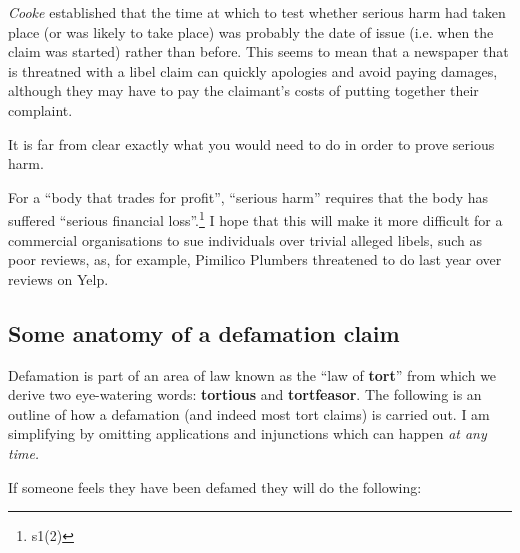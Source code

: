 \documentclass[]{article}
\begin{document}
{\it Cooke} established that the time at which to test whether serious harm had taken place (or was likely to take place) was probably the date of issue (i.e. when the claim was started) rather than before. This seems to mean that a newspaper that is threatned with a libel claim can quickly apologies and avoid paying damages, although they may have to pay the claimant's costs of putting together their complaint.

It is far from clear exactly what you would need to do in order to prove serious harm.

For a ``body that trades for profit'', ``serious harm'' requires that the body has suffered ``serious financial loss''.\footnote{s1(2)} I hope that this will make it more difficult for a commercial organisations to sue individuals over trivial alleged libels, such as poor reviews, as, for example, Pimilico Plumbers threatened to do last year over reviews on Yelp.

\subsection{Some anatomy of a defamation claim}

Defamation is part of an area of law known as the ``law of
\textbf{tort}{'' from which we derive two eye-watering words:
}\textbf{tortious} {and }\textbf{tortfeasor}{. The following is an
outline of how a defamation (and indeed most tort claims) is carried
out. I am simplifying by omitting applications and injunctions which can
happen }\emph{{at any time.}}

If someone feels they have been defamed they will do the following:
\end{document}
